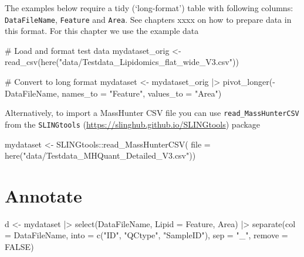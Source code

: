 \documentclass[
  letterpaper,
  DIV=11,
  numbers=noendperiod]{scrreprt}
\newenvironment{Shaded}{\begin{snugshade}}{\end{snugshade}}
\newcommand{\AttributeTok}[1]{\textcolor[rgb]{0.40,0.45,0.13}{#1}}
\newcommand{\CommentTok}[1]{\textcolor[rgb]{0.37,0.37,0.37}{#1}}
\newcommand{\ConstantTok}[1]{\textcolor[rgb]{0.56,0.35,0.01}{#1}}
\newcommand{\FunctionTok}[1]{\textcolor[rgb]{0.28,0.35,0.67}{#1}}
\newcommand{\NormalTok}[1]{\textcolor[rgb]{0.00,0.23,0.31}{#1}}
\newcommand{\OtherTok}[1]{\textcolor[rgb]{0.00,0.23,0.31}{#1}}
\newcommand{\SpecialCharTok}[1]{\textcolor[rgb]{0.37,0.37,0.37}{#1}}
\newcommand{\StringTok}[1]{\textcolor[rgb]{0.13,0.47,0.30}{#1}}
\begin{document}
The examples below require a tidy (`long-format') table with following
columns: \texttt{DataFileName}, \texttt{Feature} and \texttt{Area}. See
chapters xxxx on how to prepare data in this format. For this chapter we
use the example data

\begin{Shaded}
\begin{Highlighting}[]
\CommentTok{\# Load and format test data}
\NormalTok{mydataset\_orig }\OtherTok{\textless{}{-}} \FunctionTok{read\_csv}\NormalTok{(}\FunctionTok{here}\NormalTok{(}\StringTok{"data/Testdata\_Lipidomics\_flat\_wide\_V3.csv"}\NormalTok{))}

\CommentTok{\# Convert to long format}
\NormalTok{mydataset }\OtherTok{\textless{}{-}}\NormalTok{ mydataset\_orig }\SpecialCharTok{|\textgreater{}} 
  \FunctionTok{pivot\_longer}\NormalTok{(}\SpecialCharTok{{-}}\NormalTok{DataFileName, }\AttributeTok{names\_to =} \StringTok{"Feature"}\NormalTok{, }\AttributeTok{values\_to =} \StringTok{"Area"}\NormalTok{)}
\end{Highlighting}
\end{Shaded}

Alternatively, to import a MassHunter CSV file you can use
\texttt{read\_MassHunterCSV} from the \texttt{SLINGtools}
(\url{https://slinghub.github.io/SLINGtools}) package

\begin{Shaded}
\begin{Highlighting}[]
\NormalTok{mydataset }\OtherTok{\textless{}{-}}\NormalTok{ SLINGtools}\SpecialCharTok{::}\FunctionTok{read\_MassHunterCSV}\NormalTok{(}
  \AttributeTok{file =} \FunctionTok{here}\NormalTok{(}\StringTok{"data/Testdata\_MHQuant\_Detailed\_V3.csv"}\NormalTok{))}
\end{Highlighting}
\end{Shaded}

\hypertarget{annotate}{%
\section{Annotate}\label{annotate}}

\begin{Shaded}
\begin{Highlighting}[]
\NormalTok{d }\OtherTok{\textless{}{-}}\NormalTok{ mydataset }\SpecialCharTok{|\textgreater{}} 
  \FunctionTok{select}\NormalTok{(DataFileName, }\AttributeTok{Lipid =}\NormalTok{ Feature, Area) }\SpecialCharTok{|\textgreater{}} 
  \FunctionTok{separate}\NormalTok{(}\AttributeTok{col =}\NormalTok{ DataFileName, }
           \AttributeTok{into =} \FunctionTok{c}\NormalTok{(}\StringTok{"ID"}\NormalTok{, }\StringTok{"QCtype"}\NormalTok{, }\StringTok{"SampleID"}\NormalTok{), }
           \AttributeTok{sep =} \StringTok{"\_"}\NormalTok{, }
           \AttributeTok{remove =} \ConstantTok{FALSE}\NormalTok{)}
\end{Highlighting}
\end{Shaded}
\end{document}
